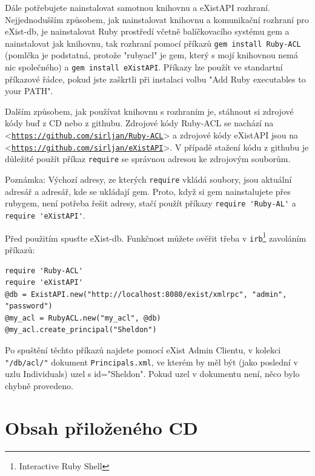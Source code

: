 \documentclass[11pt,twoside,a4paper]{book}
\let\oldUrl\url
\renewcommand\url[1]{<\texttt{\oldUrl{#1}}>}
\begin{document}
Dále potřebujete nainstalovat samotnou knihovnu a eXistAPI rozhraní.
Nejjednodušším způsobem, jak nainstalovat knihovnu a komunikační rozhraní pro eXist-db, je nainstalovat Ruby prostředí včetně balíčkovacího systému gem a nainstalovat jak knihovnu, tak rozhraní pomocí příkazů \verb|gem install Ruby-ACL| (pomlčka je podstatná, protože "rubyacl" je gem, který s mojí knihovnou nemá nic společného) a \verb|gem install eXistAPI|. Příkazy lze použít ve standartní příkazové řádce, pokud jste zaškrtli při instalaci volbu "Add Ruby executables to your PATH". 

Dalším způsobem, jak používat knihovnu s rozhraním je, stáhnout si zdrojové kódy buď z CD nebo z githubu. Zdrojové kódy Ruby-ACL se nachází na \url{https://github.com/sirljan/Ruby-ACL} a zdrojové kódy eXistAPI jsou na \url{https://github.com/sirljan/eXistAPI}. V případě stažení kódu z githubu je důležité použít příkaz \verb|require| se správnou adresou ke zdrojovým souborům. 

\noindent Poznámka: Výchozí adresy, ze kterých \verb|require| vkládá soubory, jsou aktuální adresář a adresář, kde se ukládají gem. Proto, když si gem nainstalujete přes rubygem, není potřeba řešit adresy, stačí použít příkazy \verb|require 'Ruby-AL'| a \verb|require 'eXistAPI'|.

\noindent Před použitím spusťte eXist-db. Funkčnost můžete ověřit třeba v \verb|irb|\footnote{Interactive Ruby Shell} zavoláním příkazů:

\begin{verbatim}
require 'Ruby-ACL'
require 'eXistAPI'
@db = ExistAPI.new("http://localhost:8080/exist/xmlrpc", "admin", "password")
@my_acl = RubyACL.new("my_acl", @db)
@my_acl.create_principal("Sheldon")
\end{verbatim}

Po spuštění těchto příkazů najdete pomocí eXist Admin Clientu, v kolekci \verb|"/db/acl/"| dokument  \verb|Principals.xml|, ve kterém by měl být (jako poslední v uzlu Individuals) uzel s id="Sheldon". Pokud uzel v dokumentu není, něco bylo chybně provedeno.

\chapter{Obsah přiloženého CD}
\end{document}
